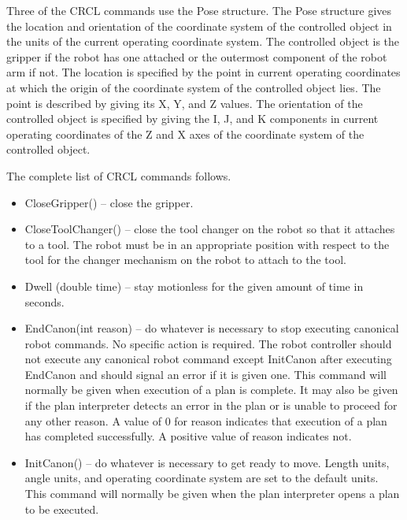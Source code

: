 Three of the CRCL commands use the Pose structure. The Pose structure gives
the location and orientation of the coordinate system of the controlled
object in the units of the current operating coordinate system. 
The controlled object is the gripper if the robot has one attached
or the outermost component of the robot arm if not.  The location is
specified by the point in current operating coordinates at which the
origin of the coordinate system of the controlled object lies. The point is
described by giving its X, Y, and Z values. The orientation of the
controlled object is specified by giving the I, J, and K components in
current operating coordinates of the Z and X axes of the coordinate
system of the controlled object. 

The complete list of CRCL commands follows.

\begin{itemize}

\item \sf CloseGripper() \rm -- close the gripper.\\

\item \sf CloseToolChanger() \rm -- close the tool changer on the robot so
  that it attaches to a tool. The robot must be in an appropriate position
  with respect to the tool for the changer mechanism on the robot to attach
  to the tool.\\

\item \sf Dwell (double time) \rm -- stay motionless for the given amount
  of \sf time \rm in seconds.\\

\item \sf EndCanon(int reason) \rm -- do whatever is necessary to stop
  executing canonical robot commands. No specific action is required. The
  robot controller should not execute any canonical robot command except
  \sf InitCanon \rm after executing \sf EndCanon \rm and should signal an
  error if it is given one.  This command will normally be given when
  execution of a plan is complete.  It may also be given if the plan
  interpreter detects an error in the plan or is unable to proceed for any
  other reason. A value of 0 for \sf reason \rm indicates that execution of
  a plan has completed successfully.  A positive value of reason indicates
  not.\\

\item \sf InitCanon() \rm -- do whatever is necessary to get ready to
move. Length units, angle units, and operating coordinate system are 
set to the default units. This command
will normally be given when the plan interpreter opens a plan to be
executed.\\


\end{itemize}
